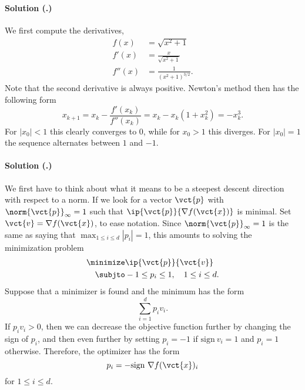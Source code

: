 \documentclass{article}
\newcounter{problemSheetNumber}
\newcounter{problems}
\renewcommand{\solution}[1]{\paragraph{Solution (\theproblemSheetNumber.\theproblems)}\addtocounter{problems}{1}\label{#1}}
\begin{document}
\solution{pr:5} We first compute the derivatives,
\begin{align*}
 f(x) &= \sqrt{x^2+1}\\
 f'(x) &= \frac{x}{\sqrt{x^2+1}}\\
 f''(x) &= \frac{1}{(x^2+1)^{3/2}}.
\end{align*}
Note that the second derivative is always positive.
Newton's method then has the following form
\begin{equation*}
 x_{k+1} = x_k - \frac{f'(x_k)}{f''(x_k)} = x_k - x_k(1+x_k^2) = -x_k^3.
\end{equation*}
For $|x_0|<1$ this clearly converges to $0$, while for $x_0>1$ this diverges. For $|x_0|=1$ the sequence alternates between $1$ and $-1$.

\solution{pr:6} We first have to think about what it means to be a steepest descent direction with respect to a norm. If we look for a vector $\vct{p}$ with $\norm{\vct{p}}_\infty=1$ such that $\ip{\vct{p}}{\nabla f(\vct{x})}$ is minimal. 
Set $\vct{v}=\nabla f(\vct{x})$, to ease notation. Since $\norm{\vct{p}}_\infty = 1$ is the same as saying that $\max_{1\leq i\leq d} |p_i| = 1$, this amounts to solving the minimization problem
\begin{align*}
 \minimize& \ip{\vct{p}}{\vct{v}}\\
 \subjto & -1 \leq p_i \leq 1, \quad 1\leq i\leq d.
\end{align*}
Suppose that a minimizer is found and the minimum has the form
\begin{equation*}
 \sum_{i=1}^d p_i v_i.
\end{equation*}
If $p_iv_i>0$, then we can decrease the objective function further by changing the sign of $p_i$, and then even further by setting $p_i=-1$ if $\mathrm{sign} \ v_i=1$ and $p_i=1$ otherwise. Therefore, the optimizer has the form
\begin{equation*}
 p_i = -\mathrm{sign} \ \nabla f(\vct{x})_i
\end{equation*}
for $1\leq i\leq d$.
\end{document}
